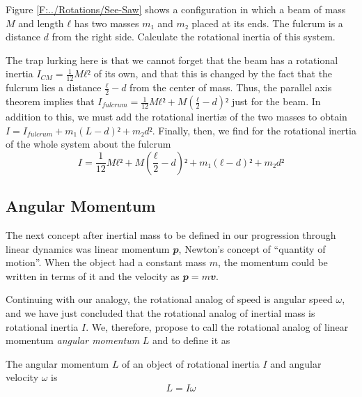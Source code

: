 
\begin{example} 
\label{Eg:SeeSaw1}
Figure \ref{F:../Rotations/See-Saw} shows a configuration in which a beam of mass $M$ and length $ℓ$ has two masses $m₁$ and $m₂$ placed at its ends. The fulcrum is a distance $d$ from the right side. Calculate the rotational inertia of this system. 
\begin{solution}
The trap lurking here is that we cannot forget that the beam has a rotational inertia $I_{CM}=\frac 1{12} M ℓ²$ of its own, and that this is changed by the fact that the fulcrum lies a distance $\frac ℓ2-d$ from the center of mass. Thus, the parallel axis theorem implies that $I_{fulcrum}= \frac 1{12} M ℓ² + M \left(\frac ℓ2-d\right)²$ just for the beam. In addition to this, we must add the rotational inerti\ae{} of the two masses to obtain $I=I_{fulcrum}+m₁ (L-d)² + m₂ d²$. Finally, then, we find for the rotational inertia of the whole system about the fulcrum
$$
I= \frac 1{12} M ℓ² + M \left(\frac ℓ2-d\right)²+m₁ (ℓ-d)² + m₂ d²  
$$
\end{solution}
\end{example}

\subsection{Angular Momentum}


The next concept after inertial mass to be defined in our progression through linear dynamics was linear momentum $𝒑$, Newton's concept of “quantity of motion”. When the object had a constant mass $m$, the momentum could be written in terms of it and the velocity as $𝒑 = m𝒗$. 


Continuing with our analogy, the rotational analog of speed is angular speed $ω$, and we have just concluded that the rotational analog of inertial mass is rotational inertia $I$. We, therefore, propose to call the rotational analog of linear momentum {\em angular momentum} $L$ and to define it as 
\begin{definition}
The angular momentum $L$ of an object of rotational inertia $I$ and angular velocity $ω$ is 
$$
L = I ω 
$$
\end{definition}

